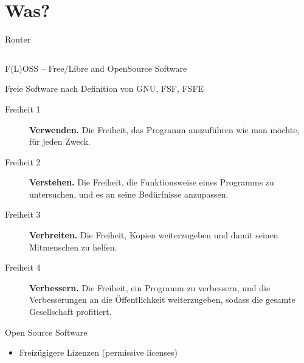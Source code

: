 \documentclass[t]{beamer}
\makeatletter
\newcommand{\strong}[1]{\@strong{#1}}
\newcommand{\@@strong}[1]{\textbf{\let\@strong\@@@strong#1}}
\newcommand{\@@@strong}[1]{\textnormal{\let\@strong\@@strong#1}}
\let\@strong\@@strong
\makeatother
\begin{document}
\section{Was?}

\begin{frame}{Router}
    \begin{columns}[T]
        \begin{column}{0.4\textwidth}

        \end{column}
        \begin{column}{0.4\textwidth}

        \end{column}
    \end{columns}
\end{frame}

\begin{frame}{F(L)OSS -- Free/Libre and OpenSource Software}
    \begin{block}{Freie Software nach Definition von GNU, FSF, FSFE}
        \begin{description}
            \item[Freiheit 1] \strong{Verwenden.} {\small Die Freiheit,
                das Programm auszuführen wie man möchte, für jeden
                Zweck.}
            \item[Freiheit 2] \strong{Verstehen.} {\small Die Freiheit,
                die Funktionsweise eines Programms zu untersuchen, und
                es an seine Bedürfnisse anzupassen.}
            \item[Freiheit 3] \strong{Verbreiten.} {\small Die Freiheit,
                Kopien weiterzugeben und damit seinen Mitmenschen zu
                helfen.}
            \item[Freiheit 4] \strong{Verbessern.} {\small Die Freiheit,
                ein Programm zu verbessern, und die Verbesserungen
                an die Öffentlichkeit weiterzugeben, sodass die
                gesamte Gesellschaft profitiert.}
        \end{description}
    \end{block}
    \pause
    \begin{block}{Open Source Software}
        \begin{itemize}
            \item Freizügigere Lizenzen (permissive licenses)
        \end{itemize}
    \end{block}
\end{frame}
\end{document}
